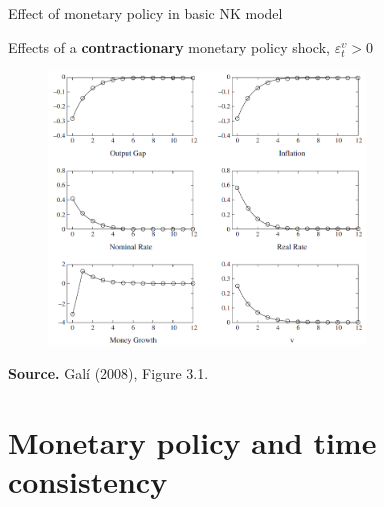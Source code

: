 \documentclass{beamer}
\begin{document}
\begin{frame}{Effect of monetary policy in basic NK model}


\begin{center}
Effects of a \textbf{contractionary} monetary policy shock, $\varepsilon^{\upsilon}_{t}>0$
\vspace{-0.1cm}
\begin{figure}[h!]
	\includegraphics[width=0.75\textwidth]{FIGURES/11_Gali_Fig3_1}
\end{figure}
\vspace{-0.2cm}
\begin{minipage}{0.5\columnwidth}
\tiny
	
\textbf{Source.} Gal\'{i} (2008), Figure 3.1.\\
\end{minipage}
\end{center}

\end{frame}

\section{Monetary policy and time consistency}

\end{document}
